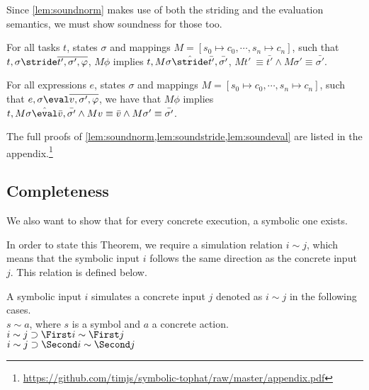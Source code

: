 Since \cref{lem:soundnorm} makes use of both the striding and the evaluation semantics,
we must show soundness for those too.

\begin{lemma}
  \label{lem:soundstride}

  For all tasks $t$, states $\sigma$ and mappings $M=[s_0\mapsto c_0,\cdots,s_n\mapsto c_n]$,
  such that $t,\sigma\stride \overline{t',\sigma',\phi}$,
  $M \phi$ implies
  $t,M\sigma \hat{\stride}\bar{t'},\bar{\sigma'}$, $M t'\ \equiv \bar{t'} \land M\sigma' \equiv \bar{\sigma'}$.

\end{lemma}

\begin{lemma}
  \label{lem:soundeval}

  For all expressions $e$, states $\sigma$ and mappings $M=[s_0\mapsto c_0,\cdots,s_n\mapsto c_n]$,
  such that $e,\sigma\eval \overline{v,\sigma',\phi}$,
  we have that $M\phi$ implies
  $t,M\sigma \hat{\eval}\bar{v},\bar{\sigma'} \land Mv \equiv \bar{v} \wedge M\sigma' \equiv \bar{\sigma'}$.

\end{lemma}

The full proofs of \cref{lem:soundnorm,lem:soundstride,lem:soundeval} are listed in the appendix.\footnote{\url{https://github.com/timjs/symbolic-tophat/raw/master/appendix.pdf}}





\subsection{Completeness}

We also want to show that for every concrete execution, a symbolic one exists.

In order to state this Theorem, we require a simulation relation $i\sim j$, which means that the symbolic input $i$ follows the same direction as the concrete input $j$.
This relation is defined below.

\begin{definition}
  A symbolic input $i$ simulates a concrete input $j$ denoted as $i\sim j$ in the following cases.\\
  $s\sim a$, where $s$ is a symbol and $a$ a concrete action.\\
  $i\sim j\implies \First i \sim \First j$\\
  $i\sim j\implies \Second i \sim \Second j$
\end{definition}

